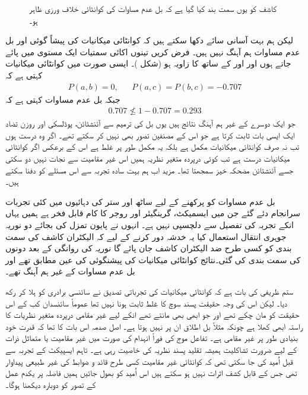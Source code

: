 \begin{figure}
\centering
{}
\caption{کاشف کو یوں سمت بند کیا گیا ہے کہ بل عدم مساوات کی کوانٹائی   خلاف ورزی   ظاہر ہو۔}
\label{شکل_بکھراو_بل_عدم_مساوات}
\end{figure}

لیکن ہم بہت آسانی سائے دکھا سکتے ہیں کہ کوانٹائی میکانیات کی پیشاً گوئی  اور بل عدم مساوات ہم آہنگ نہیں ہیں۔ فرض کریں تینوں اکائی سمتیات ایک مستوی میں پائے جاتے ہوں اور  اور  کے ساتھ  کا زاویہ  ہو (شکل )۔ ایسی صورت میں کوانٹائی میکانیات کہتی ہے کہ 
\begin{align*}
	P(a, b) = 0, && P(a, c) = P(b, c) = -\num{0.707}
\end{align*}
جبکہ بل عدم مساوات کہتی ہے کہ
\begin{align*}
	\num{0.707}\nleq1-\num{0.707} = \num{0.293}
\end{align*}
جو ایک دوسرے کے غیر ہم آہنگ نتائج ہیں یوں بل کی ترمیم سے آئنشٹائن، پوڈلسکی اور روزن تضاد ایک ایسی بات ثابت  کرتا ہے جو اس کے مصنفین تصور بھی نہیں کر سکتے تھے۔ اگر وہ درست ہوں تب نہ صرف کوانٹائی  میکانیات مکمل ہے بلکہ یہ مکمل طور پر غلط ہے اس کے برعکس اگر کوانٹائی میکانیات  درست ہے تب کوئی درپردہ متغیر نظریہ ہمیں اس غیر مقامیت سے نجات نہیں دو سکتی جسے آئنشٹائن مضحکہ خیز سمجھتا تھا۔	 مزید اب ہم بہت سادہ  تجربہ سے اس مسئلے کو دفنا سکتے ہیں۔

بل عدم مساوات کو پرکھنے کے لیے ساٹھ اور ستر کی دہائیوں میں کئی تجربات سرانجام دئے گئے جن میں ایسمیکٹ، گرینگیئر اور روجر کا کام قابل فخر ہے ہمیں یہاں انکے تجربہ کی تفصیل سے دلچسپی نہیں ہے۔ انہوں نے پایون تمزل کی بجائے دو نوریہ جوہری انتقال استعمال کیا یہ خدشہ دور کرنے کے لیے کہ الیکٹران کاشف کی سمت بندی کو کسی طرح ضد الیکٹران کاشف جان پائے گا  نوریہ کی روانگی کے بعد دونوں کی سمت بندی کی گئی۔نتائج کوانٹائی میکانیات کی پیشنگوئی  کی عین مطابق تھے اور بل عدم مساوات کے غیر ہم آہنگ تھے۔

ستم ظریفی کی بات ہے کہ کوانٹائی میکانیات کی تجرباتی تصدیق نے سائنسی برادری کو ہلا کر رکھ دیا۔ لیکن اس کی وجہ حقیقت پسند سوچ کا غلط ثابت ہونا نہیں تھا عموماً سائنسدان کب کے اس حقیقت کو مان چکے تھے اور جو ابھی بھی مانتے تھے انکے لیے غیر مقامی درپردہ متغیر نظریات کا راستہ ابھی کھلا ہے چونکہ مثلاً بل اطلاق ان پر نہیں ہوتا ہے۔ اصل صدمہ  اس بات کا تھا کہ قدرت خود بنیادی طور پر غیر مقامی ہے۔ تفاعل موج کی فوراً انہدام کی صورت میں غیر مقامیت یا متماثل ذرات کے لیے ضرورت تشاکلیت ہمیشہ تقلید پسند نظریہ کی خاصیت رہی ہے۔ تاہم ایسپیکٹ کے تجربہ سے قبل اُمید کی جا سکتی تھی کہ کوانٹائی غیر مقامیت کسی طرح قائد و ضوابط کی غیر طبیعی پیداوار تھی جس کے قابل کشف اثرات نہیں ہو سکتے ہیں اس اُمید کو بھول جائیں ہمیں فاصلہ پر یکدم عمل کے تصور کو دوبارہ دیکھنا ہوگا۔

